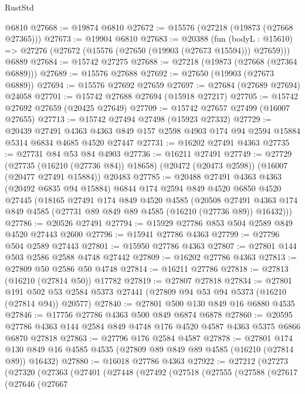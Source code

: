 \begin{lexlean}{RustStd}
\begin{coremodule}
    @6810
@27668 := @19874 @6810
@27672 := @15576 (@27218 (@19873 (@27668 @27365)))
@27673 := @19904 @6810
@27683 := @20388
    (fun (bodyL : @15610) => @27276 (@27672 (@15576 (@27650 (@19903 (@27673 @15594))) @27659)))
    @6889
@27684 := @15742 @27275
@27688 := @27218 (@19873 (@27668 (@27364 @6889)))
@27689 := @15576 @27688
@27692 := @27650 (@19903 (@27673 @6889))
@27694 := @15576 @27692 @27659
@27697 := @27684 (@27689 @27694) @24058
@27701 := @15742 @27688 @27694 (@15918 @27217)
@27705 := @15742 @27692 @27659 (@20425 @27649)
@27709 := @15742 @27657 @27499 (@16007 @27655)
@27713 := @15742 @27494 @27498 (@15923 @27332)
@27729 := @20439
    @27491
    @4363
    @4363
    @849
    @157
    @2598
    @4903
    @174
    @94
    @2594
    @15884
    @5314
    @6834
    @4685
    @4520
    @27447
@27731 := @16202 @27491 @4363
@27735 := @27731 @84 @53 @84 @4903
@27736 := @16211 @27491
@27749 := @27729
    (@27735 (@16210 (@27736 @84)) @18658)
    (@20472 (@20473 @2598))
    (@16007 (@20477 @27491 @15884))
    @20483
@27785 := @20488
    @27491
    @4363
    @4363
    (@20492 @6835 @94 @15884)
    @6844
    @174
    @2594
    @849
    @4520
    @6850
    @4520
    @27445
    (@18165
      @27491
      @174
      @849
      @4520
      @4585
      (@20508
        @27491
        @4363
        @174
        @849
        @4585
        (@27731 @89 @849 @89 @4585 (@16210 (@27736 @89)) @16432)))
@27786 := @20526 @27491
@27794 := @15929 @27786 @853 @504 @2589 @849 @4520 @27443 @2600
@27796 := @15941 @27786 @4363
@27799 := @27796 @504 @2589 @27443
@27801 := @15950 @27786 @4363
@27807 := @27801 @144 @503 @2586 @2588 @4748 @27442
@27809 := @16202 @27786 @4363
@27813 := @27809 @50 @2586 @50 @4748
@27814 := @16211 @27786
@27818 := @27813 (@16210 (@27814 @50)) @17782
@27819 := @27807 @27818
@27834 := @27801
    @191
    @502
    @53
    @2584
    @5373
    @27441
    (@27809 @94 @53 @94 @5373 (@16210 (@27814 @94)) @20577)
@27840 := @27801 @500 @130 @849 @16 @6880 @4535
@27846 := @17756 @27786 @4363 @500 @849 @6874 @6878
@27860 := @20595 @27786 @4363 @144 @2584 @849 @4748 @176 @4520 @4587 @4363 @5375 @6866 @6870 @27818
@27863 := @27796 @176 @2584 @4587
@27878 := @27801
    @174
    @130
    @849
    @16
    @4585
    @4535
    (@27809 @89 @849 @89 @4585 (@16210 (@27814 @89)) @16432)
@27880 := @16018 @27786 @4363
@27922 := @27212
    (@27273
      (@27320
        (@27363
          (@27401
            (@27448
              (@27492
                (@27518
                  (@27555
                    (@27588
                      (@27617
                        (@27646
                          (@27667

\end{coremodule}
\end{lexlean}

